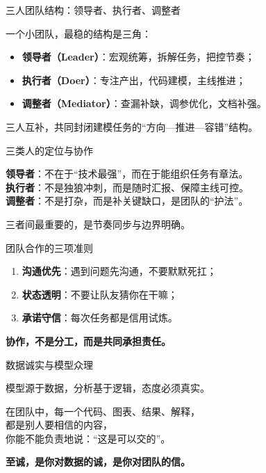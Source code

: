 \begin{frame}{\color{trustwhite}三人团队结构：领导者、执行者、调整者}
\justifying
{\color{textdarkgray}
一个小团队，最稳的结构是三角：

\vspace{0.8em}
\begin{itemize}
  \item \textbf{领导者（Leader）}：宏观统筹，拆解任务，把控节奏；
  \item \textbf{执行者（Doer）}：专注产出，代码建模，主线推进；
  \item \textbf{调整者（Mediator）}：查漏补缺，调参优化，文档补强。
\end{itemize}

\vspace{0.8em}
三人互补，共同封闭建模任务的“方向—推进—容错”结构。
}
\end{frame}

\begin{frame}{\color{trustwhite}三类人的定位与协作}
\justifying
{\color{textdarkgray}
\textbf{领导者}：不在于“技术最强”，而在于能组织任务有章法。\\
\textbf{执行者}：不是独狼冲刺，而是随时汇报、保障主线可控。\\
\textbf{调整者}：不是打杂，而是补关键缺口，是团队的“护法”。

\vspace{0.5em}
三者间最重要的，是节奏同步与边界明确。
}
\end{frame}

\begin{frame}{\color{trustwhite}团队合作的三项准则}
\justifying
{\color{textdarkgray}
\begin{enumerate}
  \item \textbf{沟通优先}：遇到问题先沟通，不要默默死扛；
  \item \textbf{状态透明}：不要让队友猜你在干嘛；
  \item \textbf{承诺守信}：每次任务都是信用试炼。
\end{enumerate}

\vspace{0.5em}
\centering
\textbf{协作，不是分工，而是共同承担责任。}
}
\end{frame}

\begin{frame}{\color{trustwhite}数据诚实与模型众理}
\justifying
{\color{textdarkgray}
模型源于数据，分析基于逻辑，态度必须真实。

\vspace{1em}
在团队中，每一个代码、图表、结果、解释，\\
都是别人要相信的内容，\\
你能不能负责地说：“这是可以交的”。

\vspace{1em}
\textbf{至诚，是你对数据的诚，是你对团队的信。}
}
\end{frame}
